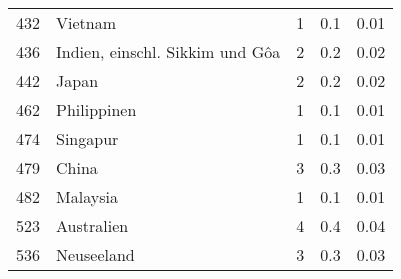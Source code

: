 \begin{longtable}{lXrrr}
        432 & \multicolumn{1}{X}{Vietnam} & %
          \num{1} &
          \num[round-mode=places,round-precision=2]{0,1} &
          \num[round-mode=places,round-precision=2]{0,01} \\

        436 & \multicolumn{1}{X}{Indien, einschl. Sikkim und Gôa} & %
          \num{2} &
          \num[round-mode=places,round-precision=2]{0,2} &
          \num[round-mode=places,round-precision=2]{0,02} \\

        442 & \multicolumn{1}{X}{Japan} & %
          \num{2} &
          \num[round-mode=places,round-precision=2]{0,2} &
          \num[round-mode=places,round-precision=2]{0,02} \\

        462 & \multicolumn{1}{X}{Philippinen} & %
          \num{1} &
          \num[round-mode=places,round-precision=2]{0,1} &
          \num[round-mode=places,round-precision=2]{0,01} \\

        474 & \multicolumn{1}{X}{Singapur} & %
          \num{1} &
          \num[round-mode=places,round-precision=2]{0,1} &
          \num[round-mode=places,round-precision=2]{0,01} \\

        479 & \multicolumn{1}{X}{China} & %
          \num{3} &
          \num[round-mode=places,round-precision=2]{0,3} &
          \num[round-mode=places,round-precision=2]{0,03} \\

        482 & \multicolumn{1}{X}{Malaysia} & %
          \num{1} &
          \num[round-mode=places,round-precision=2]{0,1} &
          \num[round-mode=places,round-precision=2]{0,01} \\

        523 & \multicolumn{1}{X}{Australien} & %
          \num{4} &
          \num[round-mode=places,round-precision=2]{0,4} &
          \num[round-mode=places,round-precision=2]{0,04} \\

        536 & \multicolumn{1}{X}{Neuseeland} & %
          \num{3} &
          \num[round-mode=places,round-precision=2]{0,3} &
          \num[round-mode=places,round-precision=2]{0,03} \\


\end{longtable}
